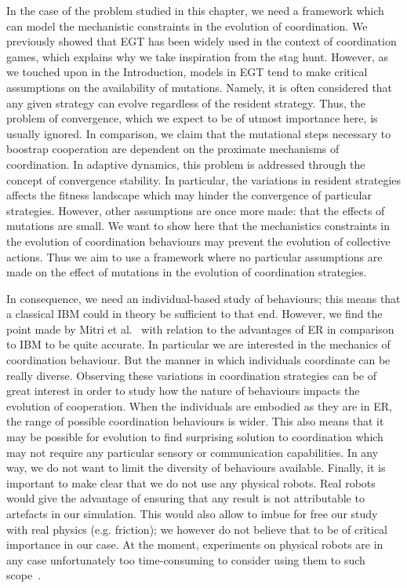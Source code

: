     In the case of the problem studied in this chapter, we need a framework which can model the mechanistic constraints in the evolution of coordination. We previously showed that EGT has been widely used in the context of coordination games, which explains why we take inspiration from the stag hunt. However, as we touched upon in the Introduction, models in EGT tend to make critical assumptions on the availability of mutations. Namely, it is often considered that any given strategy can evolve regardless of the resident strategy. Thus, the problem of convergence, which we expect to be of utmost importance here, is usually ignored. In comparison, we claim that the mutational steps necessary to boostrap cooperation are dependent on the proximate mechanisms of coordination. In adaptive dynamics, this problem is addressed through the concept of convergence stability. In particular, the variations in resident strategies affects the fitness landscape which may hinder the convergence of particular strategies. However, other assumptions are once more made: that the effects of mutations are small. We want to show here that the mechanistics constraints in the evolution of coordination behaviours may prevent the evolution of collective actions. Thus we aim to use a framework where no particular assumptions are made on the effect of mutations in the evolution of coordination strategies.

    In consequence, we need an individual-based study of behaviours; this means that a classical IBM could in theory be sufficient to that end. However, we find the point made by Mitri et al.~\parencite{Mitri2012} with relation to the advantages of ER in comparison to IBM to be quite accurate. In particular we are interested in the mechanics of coordination behaviour. But the manner in which individuals coordinate can be really diverse. Observing these variations in coordination strategies can be of great interest in order to study how the nature of behaviours impacts the evolution of cooperation. When the individuals are embodied as they are in ER, the range of possible coordination behaviours is wider. This also means that it may be possible for evolution to find surprising solution to coordination which may not require any particular sensory or communication capabilities. In any way, we do not want to limit the diversity of behaviours available. Finally, it is important to make clear that we do not use any physical robots. Real robots would give the advantage of ensuring that any result is not attributable to artefacts in our simulation. This would also allow to imbue for free our study with real physics (e.g. friction); we however do not believe that to be of critical importance in our case. At the moment, experiments on physical robots are in any case unfortunately too time-consuming to consider using them to such scope~\parencite{Mitri2012, Doncieux2015}.



